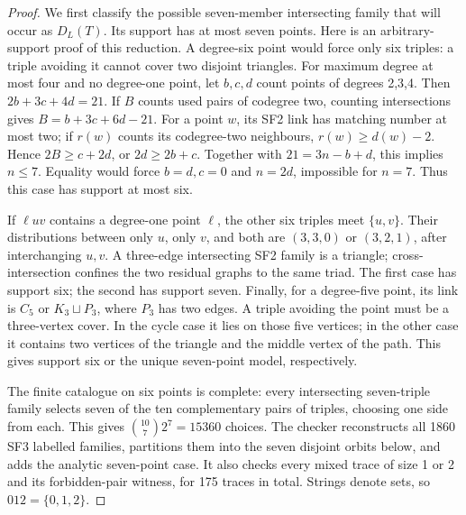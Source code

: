 \documentclass[11pt,a4paper]{article}
\numberwithin{equation}{section}
\theoremstyle{remark}
\begin{document}
\begin{proof}
We first classify the possible seven-member intersecting family that will
occur as $ D_L(T)$. Its support has at most seven points. Here is an
arbitrary-support proof of this reduction. A degree-six point would force
only six triples: a triple avoiding it cannot cover two disjoint triangles.
For maximum degree at most four and no degree-one point, let $ b,c,d $ count
points of degrees 2,3,4. Then $2b+3c+4d=21$. If $ B $ counts used pairs of
codegree two, counting intersections gives $ B=b+3c+6d-21$.
For a point $ w $, its SF2 link has matching number at most two; if $ r(w)$
counts its codegree-two neighbours, $ r(w)\ge d(w)-2$. Hence
$2B\ge c+2d $, or $2d\ge 2b+c $. Together with
$21=3n-b+d $, this implies $ n\le 7$. Equality would force $ b=d,c=0$ and
$ n=2d $, impossible for $ n=7$. Thus this case has support at most six.

If $\ell uv $ contains a degree-one point $\ell $, the other six triples
meet $\{u,v\}$. Their distributions between only $ u $, only $ v $, and both
are $(3,3,0)$ or $(3,2,1)$, after interchanging $ u,v $. A three-edge
intersecting SF2 family is a triangle; cross-intersection confines the
two residual graphs to the same triad. The first case has support six;
the second has support seven. Finally, for a degree-five point, its
link is $ C_5$ or $ K_3\sqcup P_3$, where $ P_3$ has two edges. A triple
avoiding the point must be a three-vertex cover. In the cycle case it
lies on those five vertices; in the other case it contains two vertices
of the triangle and the middle vertex of the path. This gives support
six or the unique seven-point model, respectively.

The finite catalogue on six points is complete: every intersecting
seven-triple family selects seven of the ten complementary pairs of
triples, choosing one side from each. This gives
$\binom{10}{7}2^7=15360$ choices. The checker reconstructs all 1860 SF3
labelled families, partitions them into the seven disjoint orbits below,
and adds the analytic seven-point case. It also checks every mixed trace
of size 1 or 2 and its forbidden-pair witness, for 175 traces in total.
Strings denote sets, so $012=\{0,1,2\}$.


\end{proof}
\end{document}
